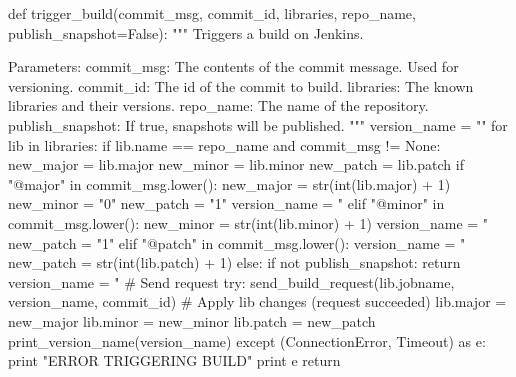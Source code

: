 \begin{pythoncode}[caption=Part of the git hook responsible for setting library version names and triggering Jenkins,label=lst:git_hook_trigger_build]
def trigger_build(commit_msg, commit_id, libraries, repo_name, publish_snapshot=False):
    """
    Triggers a build on Jenkins.

    Parameters:
        commit_msg:       The contents of the commit message. Used for versioning.
        commit_id:        The id of the commit to build.
        libraries:        The known libraries and their versions.
        repo_name:        The name of the repository.
        publish_snapshot: If true, snapshots will be published.
    """
    version_name = ""
    for lib in libraries:
        if lib.name == repo_name and commit_msg != None:
            new_major = lib.major
            new_minor = lib.minor
            new_patch = lib.patch
            if "@major" in commit_msg.lower():
                new_major = str(int(lib.major) + 1)
                new_minor = "0"
                new_patch = "1"
                version_name = "%
            elif "@minor" in commit_msg.lower():
                new_minor = str(int(lib.minor) + 1)
                version_name = "%
                new_patch = "1"
            elif "@patch" in commit_msg.lower():
                version_name = "%
                new_patch = str(int(lib.patch) + 1)
            else:
                if not publish_snapshot:
                    return
                version_name = "%
            # Send request
            try:
                send_build_request(lib.jobname, version_name, commit_id)
                # Apply lib changes (request succeeded)
                lib.major = new_major
                lib.minor = new_minor
                lib.patch = new_patch
                print_version_name(version_name)
            except (ConnectionError, Timeout) as e:
                print "ERROR TRIGGERING BUILD"
                print e
            return
\end{pythoncode}

